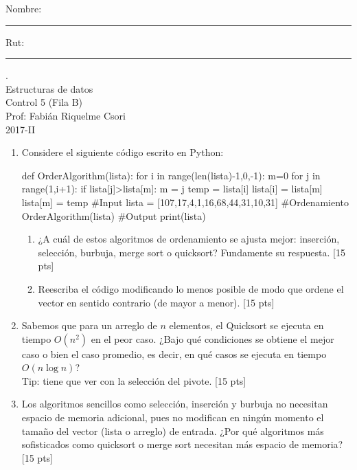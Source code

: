 \documentclass[letter,12pt,oneside]{book}
\theoremstyle{definition}
\begin{document}
\newpage
\noindent
Nombre: \rule{.6\textwidth}{.5pt} Rut: \rule{.24\textwidth}{.5pt}

\begin{center}
 {\Large
  {\color{white}.}\\
  Estructuras de datos\\[1ex]
  Control 5 (Fila B)}\\[1.2ex]
  Prof: Fabián Riquelme Csori\\
  2017-II
\end{center}

\begin{enumerate}
    \item Considere el siguiente código escrito en Python:
    
    \begin{python}
def OrderAlgorithm(lista):
    for i in range(len(lista)-1,0,-1):
        m=0
        for j in range(1,i+1):
            if lista[j]>lista[m]:
                m = j
        temp = lista[i]
        lista[i] = lista[m]
        lista[m] = temp
#Input
lista = [107,17,4,1,16,68,44,31,10,31]
#Ordenamiento
OrderAlgorithm(lista)
#Output
print(lista)
    \end{python}
    
    \begin{enumerate}
        \item ¿A cuál de estos algoritmos de ordenamiento se ajusta mejor: inserción, selección, burbuja, merge sort o quicksort? Fundamente su respuesta. \tabto{76ex} [15 pts]
        \item Reescriba el código modificando lo menos posible de modo que ordene el vector en sentido contrario (de mayor a menor). \tabto{76ex} [15 pts]
    \end{enumerate}
    \item Sabemos que para un arreglo de $n$ elementos, el Quicksort se ejecuta en tiempo $O(n^2)$ en el peor caso. ¿Bajo qué condiciones se obtiene el mejor caso o bien el caso promedio, es decir, en qué casos se ejecuta en tiempo $O(n\log n)$?\\Tip: tiene que ver con la selección del pivote. \tabto{81ex} [15 pts]
    \item Los algoritmos sencillos como selección, inserción y burbuja no necesitan espacio de memoria adicional, pues no modifican en ningún momento el tamaño del vector (lista o arreglo) de entrada. ¿Por qué algoritmos más sofisticados como quicksort o merge sort necesitan más espacio de memoria? \tabto{81ex} [15 pts]
\end{enumerate}
\end{document}
